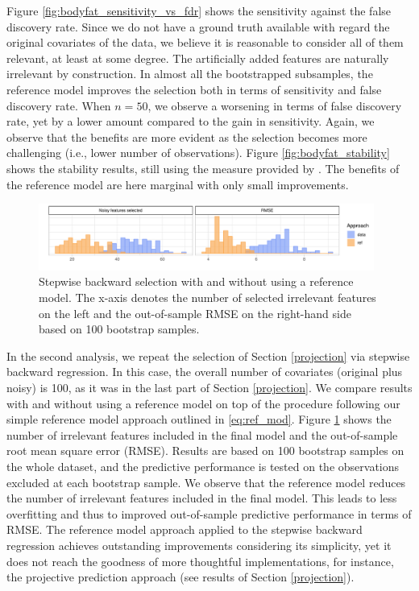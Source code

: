 \documentclass[american,]{article}
\theoremstyle{definition}
\begin{document}
Figure \ref{fig:bodyfat_sensitivity_vs_fdr} shows the sensitivity
against the false discovery rate. Since we do not have a ground truth
available with regard the original covariates of the data, we believe
it is reasonable to consider all of them relevant, at least at some
degree. The artificially added features are naturally irrelevant by
construction. In almost all the bootstrapped subsamples, the reference
model improves the selection both in terms of sensitivity and false
discovery rate. When $n=50$, we observe a worsening in terms of false
discovery rate, yet by a lower amount compared to the gain in
sensitivity. Again, we observe that the benefits are more evident as
the selection becomes more challenging (i.e., lower number of
observations). Figure \ref{fig:bodyfat_stability} shows the stability
results, still using the measure provided by
\cite{paper:stability}. The benefits of the reference model are here
marginal with only small improvements.

\begin{figure}[tp]
  \centering
  \includegraphics[width=0.98\textwidth]{graphics/bodyfat_step_refvsdata.pdf}
  \caption{Stepwise backward selection with and without using a reference model. The x-axis denotes the number of selected irrelevant features on the left and the out-of-sample RMSE on the right-hand side based on 100 bootstrap samples.\\}
  \label{fig:bodyfat_step_refvsdata}
\end{figure}

In the second analysis, we repeat the selection of Section
\ref{projection} via stepwise backward regression. In this case, the
overall number of covariates (original plus noisy) is 100, as it was
in the last part of Section \ref{projection}. We compare results with
and without using a reference model on top of the procedure following
our simple reference model approach outlined in
\eqref{eq:ref_mod}. Figure \ref{fig:bodyfat_step_refvsdata} shows the
number of irrelevant features included in the final model and the
out-of-sample root mean square error (RMSE). Results are based on 100
bootstrap samples on the whole dataset, and the predictive performance
is tested on the observations excluded at each bootstrap sample. We
observe that the reference model reduces the number of irrelevant
features included in the final model. This leads to less overfitting
and thus to improved out-of-sample predictive performance in terms of
RMSE. The reference model approach applied to the stepwise backward
regression achieves outstanding improvements considering its
simplicity, yet it does not reach the goodness of more thoughtful
implementations, for instance, the projective prediction approach (see
results of Section \ref{projection}).
\end{document}
